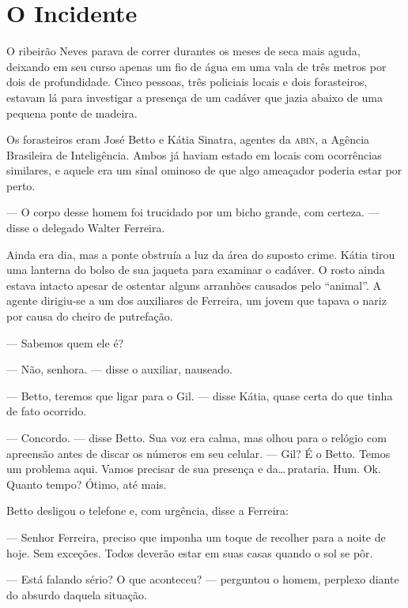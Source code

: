 \chapter{O Incidente}


O ribeirão Neves parava de correr durantes os meses de seca mais aguda,
deixando em seu curso apenas um fio de água em uma vala de três metros
por dois de profundidade. Cinco pessoas, três policiais locais e dois
forasteiros, estavam lá para investigar a presença de um cadáver que
jazia abaixo de uma pequena ponte de madeira.

Os forasteiros eram José Betto e Kátia Sinatra, agentes da
\textsc{abin}, a Agência Brasileira de Inteligência. Ambos já haviam
estado em locais com ocorrências similares, e aquele era um sinal
ominoso de que algo ameaçador poderia estar por perto.

--- O corpo desse homem foi trucidado por um bicho grande, com certeza.
--- disse o delegado Walter Ferreira.

Ainda era dia, mas a ponte obstruía a luz da área do suposto crime.
Kátia tirou uma lanterna do bolso de sua jaqueta para examinar o
cadáver. O rosto ainda estava intacto apesar de ostentar alguns
arranhões causados pelo “animal”. A agente dirigiu-se a um dos
auxiliares de Ferreira, um jovem que tapava o nariz por causa do cheiro
de putrefação.

--- Sabemos quem ele é?

--- Não, senhora. --- disse o auxiliar, nauseado.

--- Betto, teremos que ligar para o Gil. --- disse Kátia, quase certa do
que tinha de fato ocorrido.

--- Concordo. --- disse Betto. Sua voz era calma, mas olhou para o
relógio com apreensão antes de discar os números em seu celular. ---
Gil? É o Betto. Temos um problema aqui. Vamos precisar de sua presença e
da\ldots\,prataria. Hum. Ok. Quanto tempo? Ótimo, até mais.

Betto desligou o telefone e, com urgência, disse a Ferreira:

--- Senhor Ferreira, preciso que imponha um toque de recolher para a
noite de hoje. Sem exceções. Todos deverão estar em suas casas quando o
sol se pôr.

--- Está falando sério? O que aconteceu? --- perguntou o homem, perplexo
diante do absurdo daquela situação.

